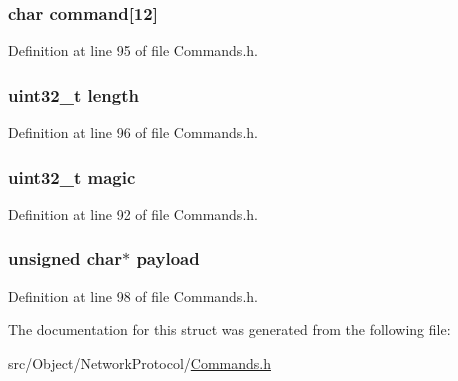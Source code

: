 \hypertarget{struct_cmd_verack_a5b9e40150e73a908b8815ab282e5a4d3}{
\subsubsection[{command}]{\setlength{\rightskip}{0pt plus 5cm}char {\bf command}\mbox{[}12\mbox{]}}}
\label{struct_cmd_verack_a5b9e40150e73a908b8815ab282e5a4d3}


Definition at line 95 of file Commands.h.

\hypertarget{struct_cmd_verack_aebb70c2aab3407a9f05334c47131a43b}{
\subsubsection[{length}]{\setlength{\rightskip}{0pt plus 5cm}uint32\_\-t {\bf length}}}
\label{struct_cmd_verack_aebb70c2aab3407a9f05334c47131a43b}


Definition at line 96 of file Commands.h.

\hypertarget{struct_cmd_verack_a57f54349f4fd1cbbb52058812e146af2}{
\subsubsection[{magic}]{\setlength{\rightskip}{0pt plus 5cm}uint32\_\-t {\bf magic}}}
\label{struct_cmd_verack_a57f54349f4fd1cbbb52058812e146af2}


Definition at line 92 of file Commands.h.

\hypertarget{struct_cmd_verack_a330f1bb25881c43b17265cdc48d8b5a2}{
\subsubsection[{payload}]{\setlength{\rightskip}{0pt plus 5cm}unsigned char$\ast$ {\bf payload}}}
\label{struct_cmd_verack_a330f1bb25881c43b17265cdc48d8b5a2}


Definition at line 98 of file Commands.h.



The documentation for this struct was generated from the following file:\begin{DoxyCompactItemize}
\item 
src/Object/NetworkProtocol/\hyperlink{_commands_8h}{Commands.h}\end{DoxyCompactItemize}
